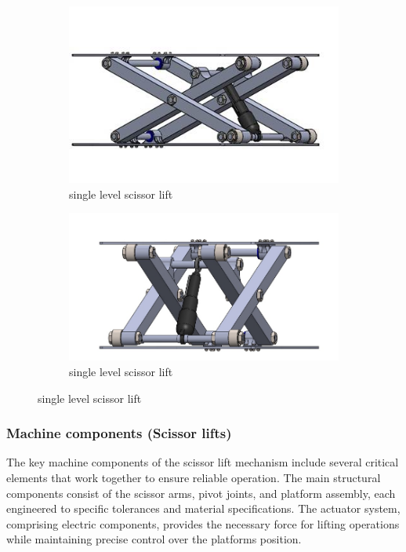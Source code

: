 \documentclass[../../main]{subfiles}
\begin{document}
\begin{figure}
\centering
\begin{subfigure}[b]{0.45\textwidth}
  \includegraphics[width=\textwidth]{img/image082.jpg}
  \caption{single level scissor lift}
\end{subfigure}
\hfil
\begin{subfigure}[b]{0.45\textwidth}
  \includegraphics[width=\textwidth]{img/image083.jpg}
  \caption{single level scissor lift}
\end{subfigure}
\end{figure}
\newpage
\subsubsection{Machine components (Scissor lifts)}

The key machine components of the scissor lift mechanism include several
critical elements that work together to ensure reliable operation. The
main structural components consist of the scissor arms, pivot joints,
and platform assembly, each engineered to specific tolerances and
material specifications. The actuator system, comprising electric
components, provides the necessary force for lifting operations while
maintaining precise control over the platform\textquotesingle s
position.
\end{document}
